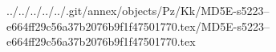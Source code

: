 ../../../../../.git/annex/objects/Pz/Kk/MD5E-s5223--e664ff29c56a37b2076b9f1f47501770.tex/MD5E-s5223--e664ff29c56a37b2076b9f1f47501770.tex